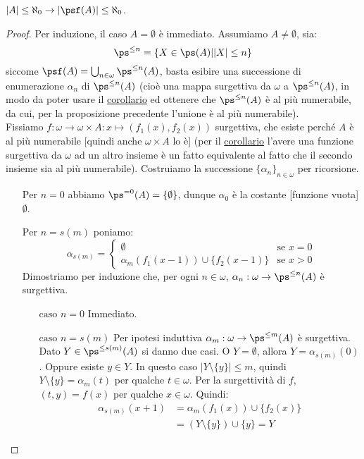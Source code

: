 \documentclass[11pt]{scrartcl}
\begin{document}
\begin{proposition}
	$|A| \leq \aleph_0 \rightarrow |\psf(A)| \leq \aleph_0$.
\end{proposition}

\begin{proof}
	Per induzione, il caso $A = \emptyset$ è immediato. Assumiamo $A \ne \emptyset$, sia:
	\[ \ps^{\leq n} = \{X \in \ps(A) | |X| \leq n\}
		\]
	siccome $\psf(A) = \bigcup_{n \in \omega} \ps^{\leq n}(A)$, basta esibire una successione di enumerazione $\alpha_n$ di $\ps^{\leq n}(A)$
	(cioè una mappa surgettiva da $\omega$ a $\ps^{\leq n}(A)$, in modo da poter usare il \hyperref[disugcardnum]{corollario} ed ottenere che $\ps^{\leq n}(A)$ è al più numerabile,
	da cui, per la proposizione precedente l'unione è al più numerabile).\\
	Fissiamo $f : \omega \rightarrow \omega \times A : x \mapsto (f_1(x),f_2(x))$ surgettiva, che esiste perché $A$ è al più numerabile [quindi anche $\omega \times A$ lo è] (per il \hyperref[disugcardnum]{corollario} l'avere una funzione surgettiva da $\omega$
	ad un altro insieme è un fatto equivalente al fatto che il secondo insieme sia al più numerabile). Costruiamo la successione $\{\alpha_n\}_{n \in \omega}$ per ricorsione.
	\begin{itemize}
		\item[$\boxed{\text{Per $n = 0$}}$] abbiamo $\ps^{=0}(A) = \{\emptyset\}$, dunque $\alpha_0$ è la costante [funzione vuota] $\emptyset$.
		\item[$\boxed{\text{Per $n = s(m)$}}$] poniamo:
		\[ \alpha_{s(m)} = \begin{cases}
			\emptyset &\text{se $x = 0$} \\
			\alpha_m(f_1(x-1)) \cup \{f_2(x - 1)\} &\text{se $x > 0$}
		\end{cases}
			\]
		Dimostriamo per induzione che, per ogni $n \in \omega$, $\alpha_n : \omega \rightarrow \ps^{\leq n} (A)$ è surgettiva.
		\begin{itemize}
			\item[$\boxed{\text{caso $n = 0$}}$] Immediato.
			\item[$\boxed{\text{caso $n = s(m)$}}$] Per ipotesi induttiva $\alpha_m : \omega \rightarrow \ps^{\leq m}(A)$ è surgettiva. Dato $Y \in \ps^{\leq s(m)}(A)$ si danno due casi.
			O $Y = \emptyset$, allora $Y = \alpha_{s(m)}(0)$. Oppure esiste $y \in Y$. In questo caso $|Y\setminus\{y\}| \leq m$, quindi $Y \setminus\{y\} = \alpha_m(t)$ per qualche $t \in \omega$.
			Per la surgettività di $f$, $(t,y) = f(x)$ per qualche $x \in \omega$. Quindi:
			\[ \begin{split}
				\alpha_{s(m)}(x+1) &= \alpha_m(f_1(x)) \cup \{f_2(x)\} \\
								   &= (Y \setminus\{y\}) \cup \{y\} = Y
			\end{split}
				\]
		\end{itemize}
	\end{itemize}
\end{proof}
\end{document}
